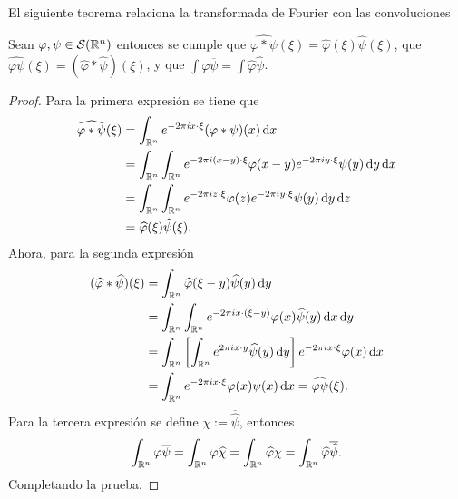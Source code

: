 El siguiente teorema relaciona la transformada de Fourier con las 
convoluciones 
\begin{theorem}
    Sean $\varphi,\psi\in\mathcal{S}(\mathbb{R}^n)$ entonces se cumple que 
    $\widehat{\varphi*\psi}(\xi) = \widehat{\varphi}(\xi) 
    \widehat{\psi}(\xi)$, que 
    $\widehat{\varphi\psi}(\xi) = (\widehat{\varphi} * 
    \widehat{\psi})(\xi)$, y que $\int \varphi\overline{\psi} = \int \widehat{\varphi}\overline{\widehat{\psi}}$.
    \label{theo:operations-fourier}
\end{theorem}
\begin{proof}
    Para la primera expresión se tiene que 
    \begin{align*}
        \widehat{\varphi*\psi}(\xi) &= 
        \int_{\mathbb{R}^n} e^{-2\pi i x\cdot\xi} (\varphi*\psi)(x)\mathop{}\!\mathrm{d} x \\
        & = \int_{\mathbb{R}^n} \int_{\mathbb{R}^n} e^{-2\pi i (x-y)\cdot\xi} 
        \varphi(x-y)e^{-2\pi i y\cdot\xi} \psi(y) \mathop{}\!\mathrm{d} y \mathop{}\!\mathrm{d} x \\
        & = \int_{\mathbb{R}^n} \int_{\mathbb{R}^n} e^{-2\pi i z\cdot\xi} 
        \varphi(z)e^{-2\pi i y\cdot\xi} \psi(y) \mathop{}\!\mathrm{d} y \mathop{}\!\mathrm{d} z \\
        & = \widehat{\varphi}(\xi)\widehat{\psi}(\xi).
    \end{align*}
    Ahora, para la segunda expresión 
    \begin{align*}
        (\widehat{\varphi} * \widehat{\psi})(\xi) & = 
        \int_{\mathbb{R}^n} \widehat{\varphi}(\xi - y) \widehat{\psi}(y) \mathop{}\!\mathrm{d} y \\
        & = \int_{\mathbb{R}^n} \int_{\mathbb{R}^n} e^{-2\pi i x\cdot(\xi - y)} \varphi(x)
        \widehat{\psi}(y) \mathop{}\!\mathrm{d} x \mathop{}\!\mathrm{d} y \\ 
        & = \int_{\mathbb{R}^n} \left[\int_{\mathbb{R}^n}  e^{2\pi i x\cdot y}\widehat{\psi}(y) 
        \mathop{}\!\mathrm{d} y\right] e^{-2\pi i x\cdot\xi} \varphi(x) \mathop{}\!\mathrm{d} x \\
        &= \int_{\mathbb{R}^n} e^{-2\pi i x\cdot\xi} \varphi(x) \psi(x) \mathop{}\!\mathrm{d} x = 
        \widehat{\varphi\psi}(\xi).
    \end{align*}
    Para la tercera expresión se define $\chi := \overline{\widehat{\psi}}$, entonces
    \begin{equation*}
    	\int_{\mathbb{R}^n} \varphi \overline{\psi} = \int_{\mathbb{R}^n} \varphi \widehat{\chi} = \int_{\mathbb{R}^n} \widehat{\varphi}\chi = \int_{\mathbb{R}^n} \widehat{\varphi}\overline{\widehat{\psi}}.
    \end{equation*}
    Completando la prueba.
\end{proof}

